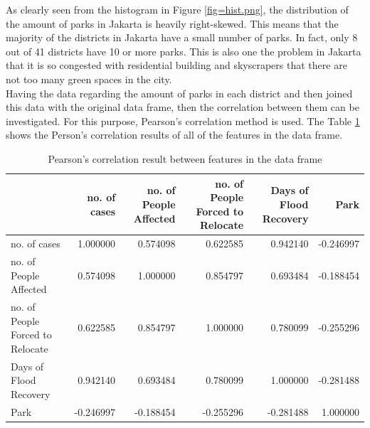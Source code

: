 \noindent
As clearly seen from the histogram in Figure \ref{fig=hist.png}, the distribution of the amount of parks in Jakarta is heavily right-skewed. This means that the majority of the districts in Jakarta have a small number of parks. In fact, only 8 out of 41 districts have 10 or more parks. This is also one the problem in Jakarta that it is so congested with residential building and skyscrapers that there are not too many green spaces in the city.\\ 

\noindent
Having the data regarding the amount of parks in each district and then joined this data with the original data frame, then the correlation between them can be investigated. For this purpose, Pearson's correlation method is used. The Table \ref{tab:6} shows the Person's correlation results of all of the features in the data frame.\\

\begin{table}
\centering
\caption{Pearson's correlation result between features in the data frame}
\label{tab:6}
\begin{adjustbox}{width=\textwidth}
\begin{tabular}{lrrrrr}
\toprule
{} &  no. of cases &  no. of People Affected &  no. of People Forced to Relocate &  Days of Flood Recovery &      Park \\
\midrule
no. of cases                     &      1.000000 &                0.574098 &                          0.622585 &                0.942140 & -0.246997 \\
no. of People Affected           &      0.574098 &                1.000000 &                          0.854797 &                0.693484 & -0.188454 \\
no. of People Forced to Relocate &      0.622585 &                0.854797 &                          1.000000 &                0.780099 & -0.255296 \\
Days of Flood Recovery           &      0.942140 &                0.693484 &                          0.780099 &                1.000000 & -0.281488 \\
Park                             &     -0.246997 &               -0.188454 &                         -0.255296 &               -0.281488 &  1.000000 \\
\bottomrule
\end{tabular}
\end{adjustbox}
\end{table}

